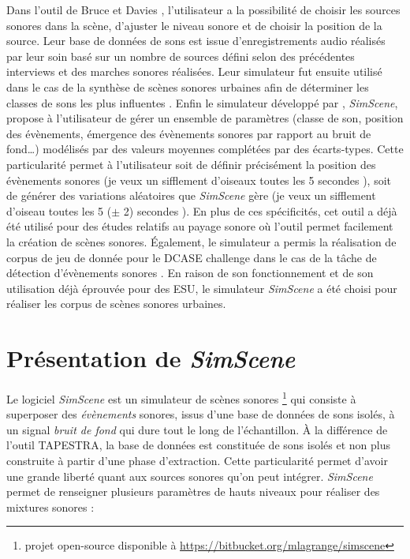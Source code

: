 Dans l'outil de Bruce et Davies \cite{bruce_development_2009}, l'utilisateur a la possibilité de choisir les sources sonores dans la scène, d'ajuster le niveau sonore et de choisir la position de la source. Leur base de données de sons est issue d'enregistrements audio réalisés par leur soin basé sur un nombre de sources défini selon des précédentes interviews et des marches sonores réalisées. Leur simulateur fut ensuite utilisé dans le cas de la synthèse de scènes sonores urbaines afin de déterminer les classes de sons les plus influentes \cite{davies2014soundscape}.
Enfin le simulateur développé par \cite{lagrange2015evaluation}, \textit{SimScene}, propose à l'utilisateur de gérer un ensemble de paramètres (classe de son, position des évènements, émergence des évènements sonores par rapport au bruit de fond\dots) modélisés par des valeurs moyennes complétées par des écarts-types. 
Cette particularité permet à l'utilisateur soit de définir précisément la position des évènements sonores (\og je veux un sifflement d'oiseaux toutes les 5 secondes \fg{}), soit de générer des variations aléatoires que \textit{SimScene} gère (\og je veux un sifflement d'oiseau toutes les 5 ($\pm$ 2) secondes \fg{}). 
En plus de ces spécificités, cet outil a déjà été utilisé pour des études relatifs au payage sonore \cite{lafay2015approaching} où l'outil permet facilement la création de scènes sonores. \'Egalement, le simulateur a permis la réalisation de corpus de jeu de donnée pour le DCASE challenge \cite{stowell2015detection} dans le cas de la tâche de détection d'évènements sonores \cite{lagrange2015evaluation}. 
En raison de son fonctionnement et de son utilisation déjà éprouvée pour des ESU, le simulateur \textit{SimScene} a été choisi pour réaliser les corpus de scènes sonores urbaines.

\section{Présentation de \textit{SimScene}}
Le logiciel \textit{SimScene} \cite{rossignol_simscene_2015} est un simulateur de scènes sonores \footnote{projet open-source disponible à \url{https://bitbucket.org/mlagrange/simscene}} qui consiste à superposer des \textit{évènements} sonores, issus d'une base de données de sons isolés, à un signal \textit{bruit de fond} qui dure tout le long de l'échantillon. À la différence de l'outil TAPESTRA, la base de données est constituée de sons isolés et non plus construite à partir d'une phase d'extraction. Cette particularité permet d'avoir une grande liberté quant aux sources sonores qu'on peut intégrer. \textit{SimScene} permet de renseigner plusieurs paramètres de hauts niveaux pour réaliser des mixtures sonores :

